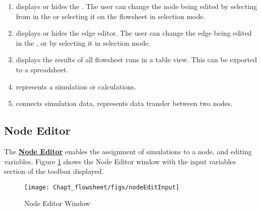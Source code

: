 \begin{enumerate}
	\item {} displays or hides the . The user can change the node being edited by selecting from  in the  or selecting it on the flowsheet in selection mode.
	\item {} displays or hides the edge editor. The user can change the edge being edited in the , or by selecting it in selection mode.
	\item {} displays the results of all flowsheet runs in a table view. This can be exported to a spreadsheet.
	\item {} represents a simulation or calculations.
	\item {} connects simulation data, represents data transfer between two nodes.
\end{enumerate}

\subsection{Node Editor}
The \textbf{\underline{Node Editor}} enables the assignment of simulations to a node, and editing variables. Figure \ref{fig.node.editor.input} shows the Node Editor window with the input variables section of the toolbox displayed.
\begin{figure}[H]
	\begin{center}
		\texttt{[image: Chapt\_flowsheet/figs/nodeEditInput]}
		\caption{Node Editor Window}
		\label{fig.node.editor.input}
	\end{center}
\end{figure}

